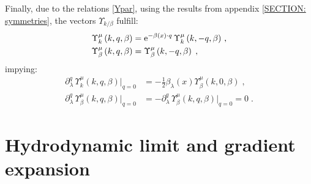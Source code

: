 \documentclass[prd,superscriptaddress,nofootinbib,notitlepage]{revtex4-1}
\newcommand{\e}{{\rm e}}
\begin{document}
Finally, due to the relations \eqref{Ypar}, using the results from appendix \ref{SECTION: symmetries},   the vectors $\Upsilon_{k/\beta}$ fulfill:
%
\begin{subequations}\label{Upsiloj q = Upsilon -q exp}
    \begin{align}
        \Upsilon^{\mu}_k\left(k,q,\beta\right)&=\e^{-\beta(x)\cdot q}\,\Upsilon^{\mu}_k\left(k,-q,\beta\right)\,,\\
        \Upsilon^{\mu}_\beta\left(k,q,\beta\right)&=\Upsilon^{\mu}_\beta\left(k,-q,\beta\right)\;,
    \end{align}
\end{subequations}
%
impying:
%
\begin{subequations}\label{qderiv Upsilon}
    \begin{align}
        \partial^q_\lambda\,\Upsilon^{\mu}_k\left(k,q,\beta\right)\Big|_{q=0}&=-\frac{1}{2}\beta_\lambda(x)\Upsilon^{\mu}_\beta\left(k,0,\beta\right)\;,\\
        \partial^q_\lambda\,\Upsilon^{\mu}_\beta\left(k,q,\beta\right)\Big|_{q=0}&=-\partial^q_\lambda\,\Upsilon^{\mu}_\beta\left(k,q,\beta\right)\Big|_{q=0}=0\;.
    \end{align}
\end{subequations}
%

\section{Hydrodynamic limit and gradient expansion}
\label{hydrolimit}
\end{document}
